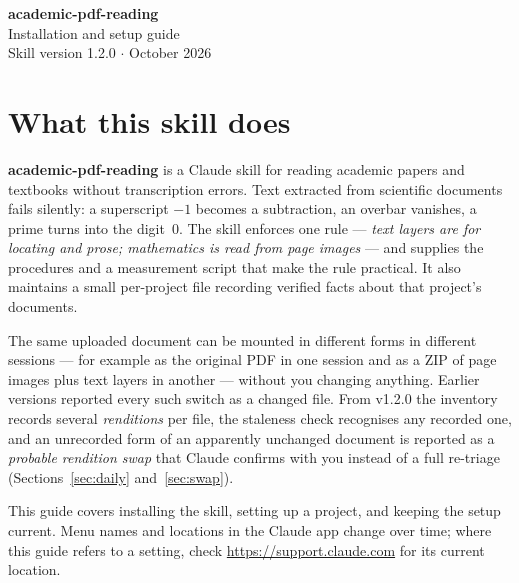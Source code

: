 \documentclass[11pt,a4paper]{article}
\begin{document}
\begin{center}
  {\sffamily\bfseries\LARGE\color{accent} academic-pdf-reading}\\[0.5em]
  {\sffamily\Large Installation and setup guide}\\[0.8em]
  {\small Skill version 1.2.0 \quad$\cdot$ October 2026}
\end{center}

\vspace{0.5em}

\section*{What this skill does}

\textbf{academic-pdf-reading} is a Claude skill for reading academic papers
and textbooks without transcription errors. Text extracted from scientific
documents fails silently: a superscript $-1$ becomes a subtraction, an
overbar vanishes, a prime turns into the digit~0. The skill enforces one
rule --- \emph{text layers are for locating and prose; mathematics is read
from page images} --- and supplies the procedures and a measurement script
that make the rule practical. It also maintains a small per-project file
recording verified facts about that project's documents.

\begin{note}
The same uploaded document can be mounted in different forms in different
sessions --- for example as the original PDF in one session and as a ZIP of
page images plus text layers in another --- without you changing anything.
Earlier versions reported every such switch as a changed file. From v1.2.0
the inventory records several \emph{renditions} per file, the staleness
check recognises any recorded one, and an unrecorded form of an apparently
unchanged document is reported as a \emph{probable rendition swap} that
Claude confirms with you instead of a full re-triage
(Sections~\ref{sec:daily} and~\ref{sec:swap}).
\end{note}

\begin{note}
This guide covers installing the skill, setting up a project, and keeping
the setup current. Menu names and locations in the Claude app change over
time; where this guide refers to a setting, check
\url{https://support.claude.com} for its current location.
\end{note}

\tableofcontents
\end{document}
